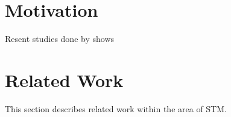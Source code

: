 \makeatletter {}\makeatother
{}
\section{Motivation}
Resent studies done by \cite{dpt907e14trending} shows 

\section{Related Work}
This section describes related work within the area of \ac{STM}. 
\worksheetend